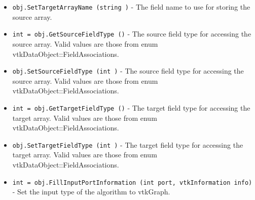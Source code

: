 \begin{itemize}
\item  \verb|obj.SetTargetArrayName (string )| -  The field name to use for storing the source array.

\item  \verb|int = obj.GetSourceFieldType ()| -  The source field type for accessing the source array. Valid values are
 those from enum vtkDataObject::FieldAssociations.

\item  \verb|obj.SetSourceFieldType (int )| -  The source field type for accessing the source array. Valid values are
 those from enum vtkDataObject::FieldAssociations.

\item  \verb|int = obj.GetTargetFieldType ()| -  The target field type for accessing the target array. Valid values are
 those from enum vtkDataObject::FieldAssociations.

\item  \verb|obj.SetTargetFieldType (int )| -  The target field type for accessing the target array. Valid values are
 those from enum vtkDataObject::FieldAssociations.

\item  \verb|int = obj.FillInputPortInformation (int port, vtkInformation info)| -  Set the input type of the algorithm to vtkGraph.

\end{itemize}
